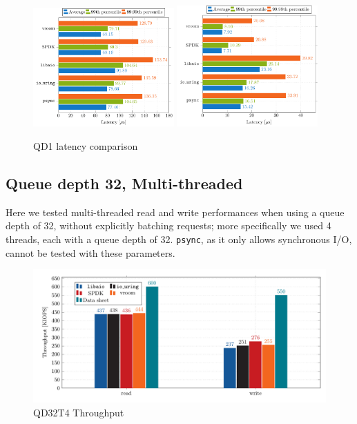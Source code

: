 \begin{figure}
  \centering
   {\includegraphics[width=0.48\textwidth]{figures/latency-read-xbar} \label{fig:lat-read}}
   {\includegraphics[width=0.48\textwidth]{figures/latency-write-xbar} \label{fig:lat-write}}
  \caption{QD1 latency comparison}
  \label{fig:lat-qd1}
\end{figure}

\subsection{Queue depth 32, Multi-threaded}
Here we tested multi-threaded read and write performances when using a queue depth of 32, without explicitly batching requests; more specifically we used 4 threads, each with a queue depth of 32. \texttt{psync}, as it only allows synchronous I/O, cannot be tested with these parameters.

\begin{figure}
  \centering
    \includegraphics[width=\textwidth]{figures/iops-qd32-ybar}
    \caption{QD32T4 Throughput}
    \label{fig:iops-qd32}
\end{figure}


